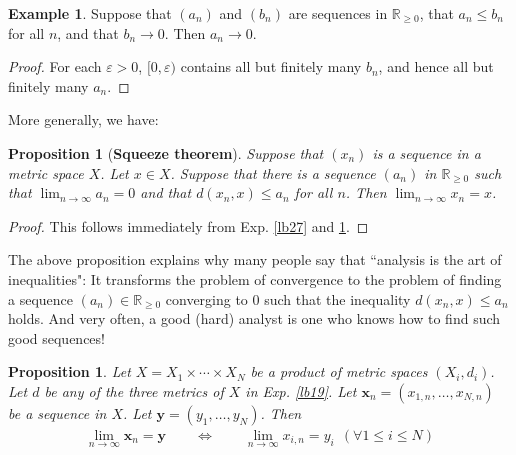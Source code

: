 \documentclass[12pt,b5paper,notitlepage]{article}
\theoremstyle{definition}
\newtheorem{eg}[df]{Example}
\theoremstyle{plain}
\newtheorem{pp}[df]{Proposition}
\newcommand{\mbf}{\mathbf}
\newcommand{\Rbb}{\mathbb R}
\newcommand{\dps}{\displaystyle}
\numberwithin{equation}{section}
\begin{document}
\begin{eg}\label{lb28}
Suppose that $(a_n)$ and $(b_n)$ are sequences in $\Rbb_{\geq 0}$, that $a_n\leq b_n$ for all $n$, and that $b_n\rightarrow 0$. Then  $a_n\rightarrow 0$. 
\end{eg}
\begin{proof}
For each $\varepsilon>0$, $[0,\varepsilon)$ contains all but finitely many $b_n$, and hence all but finitely many $a_n$.
\end{proof}


More generally, we have:

\begin{pp}[\textbf{Squeeze theorem}]\label{lb29}
Suppose that $(x_n)$ is a sequence in a metric space $X$. Let $x\in X$. Suppose that there is a sequence $(a_n)$ in $\Rbb_{\geq 0}$ such that $\dps\lim_{n\rightarrow\infty}a_n=0$ and that $d(x_n,x)\leq a_n$ for all $n$. Then $\dps\lim_{n\rightarrow\infty} x_n=x$.
\end{pp}

\begin{proof}
This follows immediately from Exp. \ref{lb27} and \ref{lb28}.
\end{proof}

The above proposition explains why many people say that ``analysis is the art of inequalities": It transforms the problem of convergence to the problem of finding a sequence $(a_n)\in\Rbb_{\geq 0}$ converging to $0$ such that the inequality $d(x_n,x)\leq a_n$ holds. And very often, a good (hard) analyst is one who knows how to find such good sequences!






\begin{pp}\label{lb38}
Let $X=X_1\times\cdots\times X_N$ be a product of metric spaces $(X_i,d_i)$. Let $d$ be any of the three metrics of $X$ in Exp. \ref{lb19}. Let $\mbf x_n=(x_{1,n},\dots,x_{N,n})$ be a sequence in $X$. Let $\mbf y=(y_1,\dots,y_N)$. Then 
\begin{align*}
\lim_{n\rightarrow\infty} \mbf x_n=\mbf y\qquad\Longleftrightarrow \qquad \lim_{n\rightarrow\infty} x_{i,n}=y_i~~(\forall 1\leq i\leq N)
\end{align*}
\end{pp}
\end{document}
